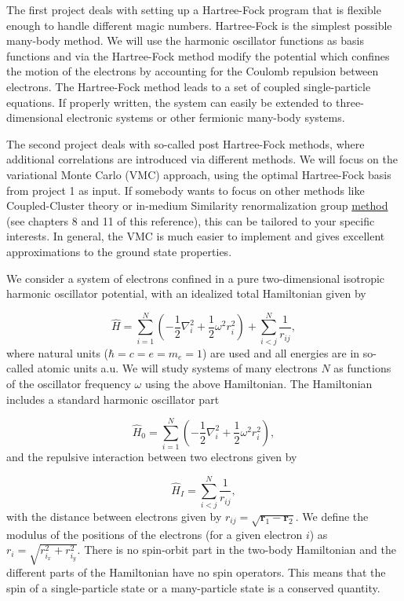 \documentclass[%
oneside,                 %
final,                   %
10pt]{article}
\begin{document}
The first project deals with setting up a Hartree-Fock program that is flexible enough to handle different magic numbers. Hartree-Fock is the simplest possible many-body method. We will use the harmonic oscillator functions as basis functions and via the Hartree-Fock method modify the potential which confines the motion of the electrons by accounting for the Coulomb repulsion between electrons. The Hartree-Fock method leads to a set of coupled single-particle equations. If properly written, the system can easily be extended to three-dimensional electronic systems or other fermionic many-body systems. 

The second project deals with so-called post Hartree-Fock methods, where additional correlations are introduced via different methods. We will focus on the variational Monte Carlo (VMC) approach, using the optimal Hartree-Fock basis from project 1 as input. If somebody wants to focus on other methods like Coupled-Cluster theory or in-medium Similarity renormalization group \href{{https://github.com/ManyBodyPhysics/LectureNotesPhysics/blob/master/doc/src/lnp.pdf}}{method} (see chapters 8 and 11 of this reference), this can be tailored to your specific interests. In general, the VMC is much easier to implement and gives excellent approximations to the ground state properties. 


We consider a system of electrons confined in a pure two-dimensional 
isotropic harmonic oscillator potential, with an idealized  total Hamiltonian given by

\begin{equation}
\label{eq:finalH}
\hat{H}=\sum_{i=1}^{N} \left(  -\frac{1}{2} \nabla_i^2 + \frac{1}{2} \omega^2r_i^2  \right)+\sum_{i<j}^{N}\frac{1}{r_{ij}},
\end{equation}
where natural units ($\hbar=c=e=m_e=1$) are used and all energies are in so-called atomic units a.u. We will study systems of many electrons $N$ as functions of the oscillator frequency  $\omega$ using the above Hamiltonian.  The Hamiltonian includes a standard harmonic oscillator part

\begin{equation*}
\hat{H}_0=\sum_{i=1}^{N} \left(  -\frac{1}{2} \nabla_i^2 + \frac{1}{2} \omega^2r_i^2  \right),
\end{equation*}
and the repulsive interaction between two electrons given by

\begin{equation*}
\hat{H}_I=\sum_{i < j}^{N}\frac{1}{r_{ij}},
\end{equation*}
with the distance between electrons given by $r_{ij}=\sqrt{\bm{r}_1-\bm{r}_2}$. We define the 
modulus of the positions of the electrons (for a given electron $i$) as $r_i = \sqrt{r_{i_x}^2+r_{i_y}^2}$.
There is no spin-orbit part in the two-body Hamiltonian and the different parts of the Hamiltonian have no spin operators. This means that the spin of a single-particle state or a many-particle state is a conserved quantity. 
\end{document}
